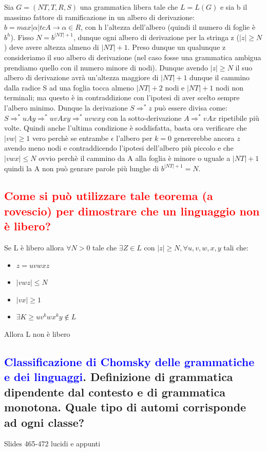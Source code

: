 \documentclass{article}
\begin{document}
Sia $G=(NT,T,R,S)$ una grammatica libera tale che $L=L(G)$ e sia b il massimo
fattore di ramificazione in un albero di derivazione: $b = max{|\alpha| tc
            A\to\alpha\in R}$, con h l'altezza dell'albero (quindi il numero di foglie è
$b^h$). Fisso $N = b^{|NT|+1}$, dunque ogni albero di derivazione per la
stringa z ($|z| \geq N$) deve avere altezza almeno di $|NT|+1$. Preso dunque un
qualunque z consideriamo il suo albero di derivazione (nel caso fosse una
grammatica ambigua prendiamo quello con il numero minore di nodi). Dunque
avendo $|z| \geq N$ il suo albero di derivazione avrà un'altezza maggiore di
$|NT| + 1$ dunque il cammino dalla radice S ad una foglia tocca almeno $|NT|+2$
nodi e $|NT|+1$ nodi non terminali; ma questo è in contraddizione con l'ipotesi
di aver scelto sempre l'albero minimo. Dunque la derivazione $S \Rightarrow^*
    z$ può essere divisa come: $S \Rightarrow^* uAy \Rightarrow^* uvAxy
    \Rightarrow^* uvwxy$ con la sotto-derivazione $A \Rightarrow^* vAx$ ripetibile
più volte. Quindi anche l'ultima condizione è soddisfatta, basta ora verificare
che $|vw| \geq 1$ vero perchè se entrambe $\epsilon$ l'albero per $k=0$
genererebbe ancora $z$ avendo meno nodi e contraddicendo l'ipotesi dell'albero
più piccolo e che $|vwx| \leq N$ ovvio perchè il cammino da A alla foglia è
minore o uguale a $|NT|+1$ quindi la A non può genrare parole più lunghe di
$b^{|NT|+1} = N$.

\subsection{\textcolor{red}{Come si può utilizzare tale teorema (a rovescio) per dimostrare che un linguaggio non è libero?}}
Se L è libero allora $\forall N > 0$ tale che $\exists Z \in L$ con $|z| \geq N, \forall u,v,w,x,y$ tali che:
\begin{itemize}
    \item $z = uvwxz$
    \item $|vwz| \leq N$
    \item $|vx| \geq 1$
    \item $\exists K \geq uv^kwx^ky \not\in L$
\end{itemize}
Allora L non è libero

\subsection{\textcolor{blue}{Classificazione di Chomsky delle grammatiche e dei linguaggi}. Definizione di grammatica dipendente dal contesto e di grammatica monotona. Quale tipo di automi corrisponde ad ogni classe?}
Slides 465-472 lucidi e appunti
\end{document}

